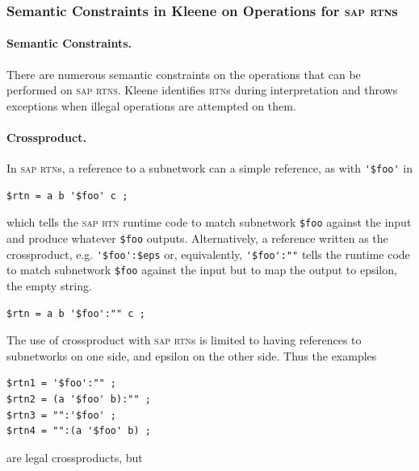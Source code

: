 \documentclass[letterpaper,12pt]{article}
\newcommand{\acro}{\textsc}
\begin{document}
\subsubsection{Semantic Constraints in Kleene on Operations for \acro{sap} \acro{rtn}s}

\label{sec:saprtnrestrictions}

\paragraph{Semantic Constraints.}

There are numerous semantic constraints on the operations that can be performed on
\acro{sap} \acro{rtns}.  Kleene identifies \acro{rtn}s during interpretation and throws
exceptions when illegal operations are attempted on them.

\paragraph{Crossproduct.}

In \acro{sap} \acro{rtn}s, a reference to a subnetwork can a simple reference,
as with \verb!'$foo'! in 

\begin{Verbatim}[fontsize=\small]
$rtn = a b '$foo' c ;
\end{Verbatim}

\noindent
which tells the \acro{sap} \acro{rtn} runtime code to match subnetwork 
\verb!$foo! against the input and produce whatever \verb!$foo! outputs.
Alternatively, a reference written as the crossproduct, e.g.\@
\verb!'$foo':$eps! or,
equivalently,
\verb!'$foo':""! tells the runtime code to match subnetwork 
\verb!$foo! against the input but to map
the output to epsilon, the empty string.

\begin{Verbatim}[fontsize=\small]
$rtn = a b '$foo':"" c ;
\end{Verbatim}

The use of crossproduct with \acro{sap} \acro{rtn}s is limited to having
references to subnetworks on one side, and epsilon on the other side.
Thus the examples

\begin{Verbatim}[fontsize=\small]
$rtn1 = '$foo':"" ;
$rtn2 = (a '$foo' b):"" ;
$rtn3 = "":'$foo' ;
$rtn4 = "":(a '$foo' b) ;
\end{Verbatim}

\noindent
are legal crossproducts, but
\end{document}
